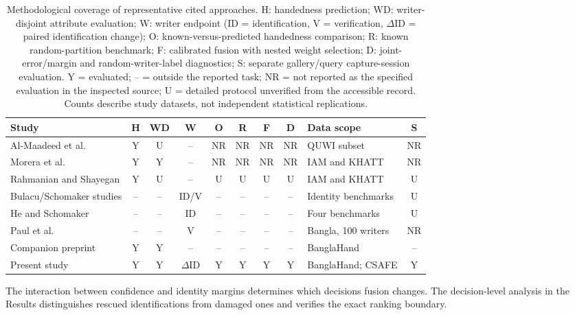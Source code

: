 \begin{table}[!t]
\caption{Methodological coverage of representative cited approaches. H: handedness prediction; WD: writer-disjoint attribute evaluation; W: writer endpoint (ID = identification, V = verification, $\Delta$ID = paired identification change); O: known-versus-predicted handedness comparison; R: known random-partition benchmark; F: calibrated fusion with nested weight selection; D: joint-error/margin and random-writer-label diagnostics; S: separate gallery/query capture-session evaluation. Y = evaluated; -- = outside the reported task; NR = not reported as the specified evaluation in the inspected source; U = detailed protocol unverified from the accessible record. Counts describe study datasets, not independent statistical replications.}\label{tab:positioning}
\centering\footnotesize
\setlength{\tabcolsep}{4pt}
\begin{tabularx}{\textwidth}{@{}p{}cccccccXc@{}}\toprule
Study & H & WD & W & O & R & F & D & Data scope & S\\\midrule
Al-Maadeed et al.\ \cite{almaadeed2016handedness} & Y & U & -- & NR & NR & NR & NR & QUWI subset & NR\\
Morera et al.\ \cite{morera2018handedness} & Y & Y & -- & NR & NR & NR & NR & IAM and KHATT & NR\\
Rahmanian and Shayegan \cite{rahmanian2021handedness} & Y & U & -- & U & U & U & U & IAM and KHATT & U\\
Bulacu/Schomaker studies \cite{bulacu2007text,schomaker2007codebooks} & -- & -- & ID/V & -- & -- & -- & -- & Identity benchmarks & U\\
He and Schomaker \cite{he2020fragnet} & -- & -- & ID & -- & -- & -- & -- & Four benchmarks & U\\
Paul et al.\ \cite{paul2024bangla} & -- & -- & V & -- & -- & -- & -- & Bangla, 100 writers & NR\\
Companion preprint \cite{prappo2026handedness} & Y & Y & -- & -- & -- & -- & -- & BanglaHand & --\\
Present study & Y & Y & $\Delta$ID & Y & Y & Y & Y & BanglaHand; CSAFE & Y\\\bottomrule
\end{tabularx}
\end{table}

The interaction between confidence and identity margins determines which decisions fusion changes. The decision-level analysis in the Results distinguishes rescued identifications from damaged ones and verifies the exact ranking boundary.


